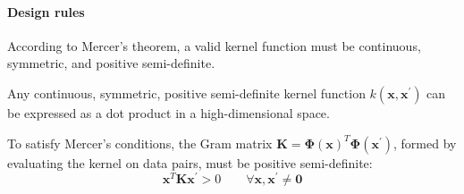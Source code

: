 \paragraph*{Design rules}
According to Mercer's theorem, a valid kernel function must be continuous, symmetric, and positive semi-definite. 
\begin{theorem}[Mercer]
    Any continuous, symmetric, positive semi-definite kernel function $k(\mathbf{x},\mathbf{x}^\prime)$ can be expressed as a dot product in a high-dimensional space. 
\end{theorem}
To satisfy Mercer's conditions, the Gram matrix $\mathbf{K}=\boldsymbol{\Phi}{(\mathbf{x})}^T\boldsymbol{\Phi}(\mathbf{x}^\prime)$, formed by evaluating the kernel on data pairs, must be positive semi-definite:
\[\mathbf{x}^T\mathbf{K}\mathbf{x}^\prime>0\qquad\forall\mathbf{x},\mathbf{x}^\prime\neq\mathbf{0}\]

